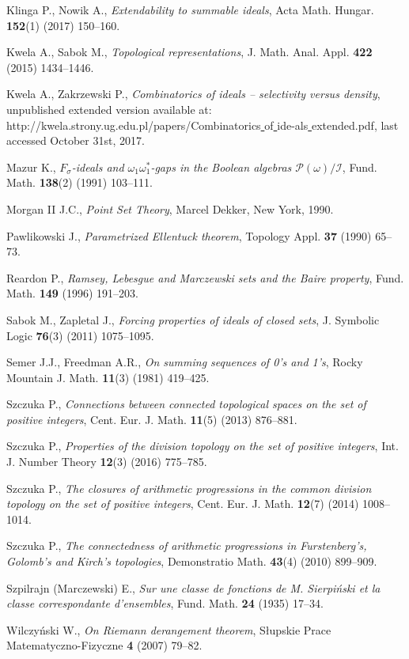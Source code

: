 \documentclass{amsart}
\theoremstyle{definition}
\theoremstyle{definition}
\begin{document}
\begin{thebibliography}{abc}

Klinga P., Nowik A., \emph{Extendability to summable ideals},
Acta Math. Hungar. {\bf 152}(1) (2017) 150--160.

Kwela A., Sabok M., \emph{Topological representations},
J. Math. Anal. Appl. {\bf 422} (2015) 1434--1446.

Kwela A., Zakrzewski P., \emph{Combinatorics of ideals -- selectivity versus density}, unpublished extended version available at:
http://kwela.strony.ug.edu.pl/papers/Combinatorics\underline{ }of\underline{ }ide-als\underline{ }extended.pdf,
last accessed October 31st, 2017.

Mazur K., \emph{$F_\sigma$-ideals and $\omega_1\omega_1^*$-gaps in the Boolean algebras $\mathcal{P}(\omega)/\mathcal{I}$},
Fund. Math. {\bf 138}(2) (1991) 103--111.

Morgan II J.C., \emph{Point Set Theory},
Marcel Dekker, New York, 1990.

Pawlikowski J., \emph{Parametrized Ellentuck theorem},
Topology Appl. {\bf 37} (1990) 65--73.

Reardon P., \emph{Ramsey, Lebesgue and Marczewski sets and the Baire property},
Fund. Math. {\bf 149} (1996) 191--203.

Sabok M., Zapletal J., \emph{Forcing  properties  of  ideals  of  closed  sets}, 
J. Symbolic Logic {\bf 76}(3) (2011) 1075--1095.

Semer J.J., Freedman A.R., \emph{On summing sequences of 0’s and 1’s},
Rocky Mountain J. Math. {\bf 11}(3) (1981) 419--425.

Szczuka P., \emph{Connections between connected topological spaces on the set of positive integers}, 
Cent. Eur. J. Math. {\bf 11}(5) (2013) 876--881.

Szczuka P., \emph{Properties of the division topology on the set of positive integers},
Int. J. Number Theory {\bf 12}(3) (2016) 775--785.

Szczuka P., \emph{The closures of arithmetic progressions in the common division topology on the set of positive integers},
Cent. Eur. J. Math. {\bf 12}(7) (2014) 1008--1014.

Szczuka P., \emph{The connectedness of arithmetic progressions in Furstenberg's, Golomb's and Kirch's topologies},
Demonstratio Math. {\bf 43}(4) (2010) 899--909.

Szpilrajn (Marczewski) E., \emph{Sur une classe de fonctions de M. Sierpiński et la classe correspondante d'ensembles},
Fund. Math. {\bf 24} (1935) 17--34.

Wilczyński W., \emph{On Riemann derangement theorem},
Słupskie Prace Matematyczno-Fizyczne {\bf 4} (2007) 79--82.

\end{thebibliography}
\end{document}
